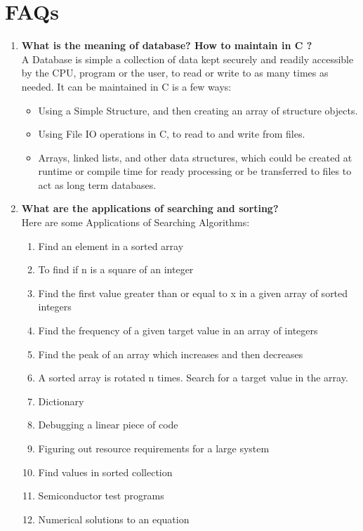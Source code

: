 \documentclass[11pt]{article}
\begin{document}
\section{FAQs}
\begin{enumerate}
	\item \textbf{What is the meaning of database? How to maintain in C ?}\\
	      A Database is simple a collection of data kept securely and readily accessible by the CPU, program or the user, to read or write to as many times as needed.
	      It can be maintained in C is a few ways:
	      \begin{itemize}
		      \item Using a Simple Structure, and then creating an array of structure objects.
		      \item Using File IO operations in C, to read to and write from files.
		      \item Arrays, linked lists, and other data structures, which could be created at runtime or compile time for ready processing or be transferred to files to act as long term databases.
	      \end{itemize}
	\item \textbf{What are the applications of searching and sorting?}\\
	      Here are some Applications of Searching Algorithms:
	      \begin{enumerate}
		      \item Find an element in a sorted array
		      \item To find if n is a square of an integer
		      \item Find the first value greater than or equal to x in a given array of sorted integers
		      \item Find the frequency of a given target value in an array of integers
		      \item Find the peak of an array which increases and then decreases
		      \item A sorted array is rotated n times. Search for a target value in the array.
		      \item Dictionary
		      \item Debugging a linear piece of code
		      \item Figuring out resource requirements for a large system
		      \item Find values in sorted collection
		      \item Semiconductor test programs
		      \item Numerical solutions to an equation
	      \end{enumerate}


\end{enumerate}
\end{document}
